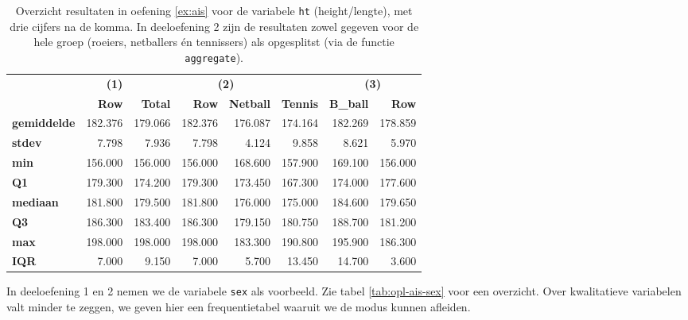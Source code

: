 \begin{table}
  \centering
  \begin{tabular}{@{}l|r|rrrr|rr@{}}
    \toprule
    & \textbf{(1)} & \multicolumn{4}{c}{\textbf{(2)}}                                                 & \multicolumn{2}{c}{\textbf{(3)}} \\ 
    & \textbf{Row} & \textbf{Total}    & \textbf{Row} & \textbf{Netball} & \textbf{Tennis} & \textbf{B\_ball}  & \textbf{Row} \\ \midrule
    \textbf{gemiddelde} & 182.376      & 179.066                      & 182.376      & 176.087          & 174.164         & 182.269           & 178.859      \\
    \textbf{stdev}      & 7.798        & 7.936                        & 7.798        & 4.124            & 9.858           & 8.621             & 5.970        \\
    \textbf{min}        & 156.000      & 156.000                      & 156.000      & 168.600          & 157.900         & 169.100           & 156.000      \\
    \textbf{Q1}         & 179.300      & 174.200                      & 179.300      & 173.450          & 167.300         & 174.000           & 177.600      \\
    \textbf{mediaan}    & 181.800      & 179.500                      & 181.800      & 176.000          & 175.000         & 184.600           & 179.650      \\
    \textbf{Q3}         & 186.300      & 183.400                      & 186.300      & 179.150          & 180.750         & 188.700           & 181.200      \\
    \textbf{max}        & 198.000      & 198.000                      & 198.000      & 183.300          & 190.800         & 195.900           & 186.300      \\
    \textbf{IQR}        & 7.000        & 9.150                        & 7.000        & 5.700            & 13.450          & 14.700            & 3.600        \\ \bottomrule
  \end{tabular}
  \caption{Overzicht resultaten in oefening \ref{ex:ais} voor de variabele \texttt{ht} (height/lengte), met drie cijfers na de komma. In deeloefening 2 zijn de resultaten zowel gegeven voor de hele groep (roeiers, netballers én tennissers) als opgesplitst (via de functie \texttt{aggregate}).}
  \label{tab:opl-ais-ht}
\end{table}

In deeloefening 1 en 2 nemen we de variabele \texttt{sex} als voorbeeld. Zie tabel \ref{tab:opl-ais-sex} voor een overzicht. Over kwalitatieve variabelen valt minder te zeggen, we geven hier een frequentietabel waaruit we de modus kunnen afleiden.

